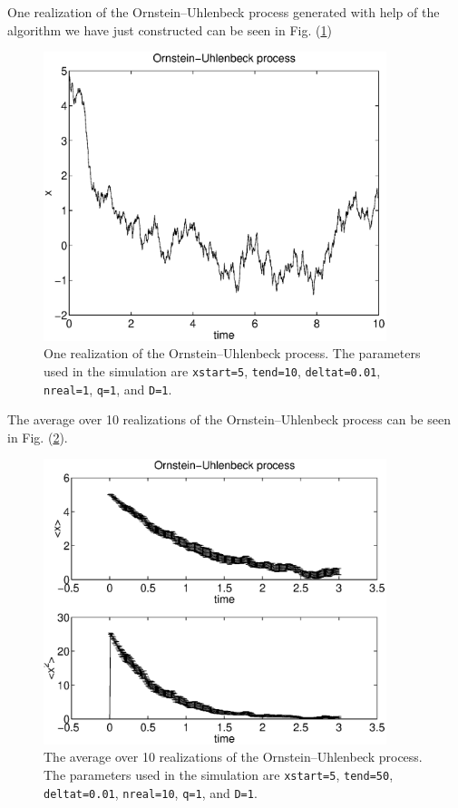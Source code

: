 One realization of the Ornstein--Uhlenbeck process generated with 
help of the algorithm we have just constructed can be seen in Fig.
(\ref{F_ORNSTEIN_R})

\begin{figure}
\label{F_ORNSTEIN_R}
\includegraphics[width=10cm]{./Figures/f_ornstein_r.eps}
\caption{One realization of the Ornstein--Uhlenbeck process. The
 parameters used in the simulation are \texttt{xstart=5},
\texttt{tend=10}, \texttt{deltat=0.01}, \texttt{nreal=1},
\texttt{q=1}, and \texttt{D=1}.}
\end{figure}

The average over 10 realizations of the Ornstein--Uhlenbeck 
process can be seen in Fig. (\ref{F_ORNSTEIN}).
\begin{figure}
\label{F_ORNSTEIN}
\includegraphics[width=10cm]{./Figures/f_ornstein.eps}
\caption{The average over 10 realizations of the Ornstein--Uhlenbeck 
process. The
 parameters used in the simulation are \texttt{xstart=5},
\texttt{tend=50}, \texttt{deltat=0.01}, \texttt{nreal=10},
\texttt{q=1}, and \texttt{D=1}.}
\end{figure}






